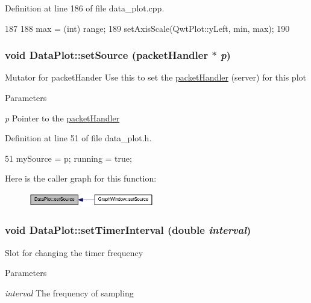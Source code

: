 Definition at line 186 of file data\_\-plot.cpp.




\begin{DoxyCode}
187 {
188     max = (int) range;
189     setAxisScale(QwtPlot::yLeft, min, max);
190 }
\end{DoxyCode}


\hypertarget{classDataPlot_aace03b9e68e11042c0fade588e2869a7}{
\subsubsection[{setSource}]{\setlength{\rightskip}{0pt plus 5cm}void DataPlot::setSource ({\bf packetHandler} $\ast$ {\em p})}}
\label{classDataPlot_aace03b9e68e11042c0fade588e2869a7}
Mutator for packetHander Use this to set the \hyperlink{classpacketHandler}{packetHandler} (server) for this plot 
\begin{DoxyParams}{Parameters}
\item[{\em p}]Pointer to the \hyperlink{classpacketHandler}{packetHandler} \end{DoxyParams}


Definition at line 51 of file data\_\-plot.h.




\begin{DoxyCode}
51 { mySource = p; running = true; }
\end{DoxyCode}




Here is the caller graph for this function:\nopagebreak
\begin{figure}[H]
\begin{center}
\leavevmode
\includegraphics[width=155pt]{classDataPlot_aace03b9e68e11042c0fade588e2869a7_icgraph}
\end{center}
\end{figure}


\hypertarget{classDataPlot_a926020e0c49d78d3d5d282848368651e}{
\subsubsection[{setTimerInterval}]{\setlength{\rightskip}{0pt plus 5cm}void DataPlot::setTimerInterval (double {\em interval})}}
\label{classDataPlot_a926020e0c49d78d3d5d282848368651e}
Slot for changing the timer frequency 
\begin{DoxyParams}{Parameters}
\item[{\em interval}]The frequency of sampling \end{DoxyParams}


